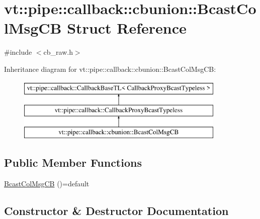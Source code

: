\hypertarget{structvt_1_1pipe_1_1callback_1_1cbunion_1_1_bcast_col_msg_c_b}{}\section{vt\+:\+:pipe\+:\+:callback\+:\+:cbunion\+:\+:Bcast\+Col\+Msg\+CB Struct Reference}
\label{structvt_1_1pipe_1_1callback_1_1cbunion_1_1_bcast_col_msg_c_b}


{\ttfamily \#include $<$cb\+\_\+raw.\+h$>$}

Inheritance diagram for vt\+:\+:pipe\+:\+:callback\+:\+:cbunion\+:\+:Bcast\+Col\+Msg\+CB\+:\begin{figure}[H]
\begin{center}
\leavevmode
\includegraphics[height=3.000000cm]{structvt_1_1pipe_1_1callback_1_1cbunion_1_1_bcast_col_msg_c_b}
\end{center}
\end{figure}
\subsection*{Public Member Functions}
\begin{DoxyCompactItemize}
\item 
\hyperlink{structvt_1_1pipe_1_1callback_1_1cbunion_1_1_bcast_col_msg_c_b_a85ac0d1128325272286f322cc1fc079f}{Bcast\+Col\+Msg\+CB} ()=default
\end{DoxyCompactItemize}


\subsection{Constructor \& Destructor Documentation}
\mbox{\label{structvt_1_1pipe_1_1callback_1_1cbunion_1_1_bcast_col_msg_c_b_a85ac0d1128325272286f322cc1fc079f}} 
